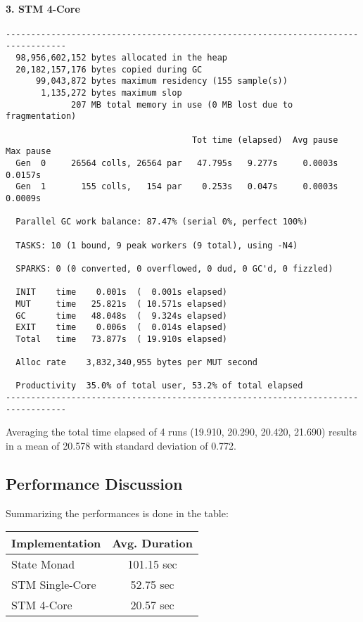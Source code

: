 \paragraph{3. STM 4-Core}
\begin{verbatim}
----------------------------------------------------------------------------------
  98,956,602,152 bytes allocated in the heap
  20,182,157,176 bytes copied during GC
      99,043,872 bytes maximum residency (155 sample(s))
       1,135,272 bytes maximum slop
             207 MB total memory in use (0 MB lost due to fragmentation)

                                     Tot time (elapsed)  Avg pause  Max pause
  Gen  0     26564 colls, 26564 par   47.795s   9.277s     0.0003s    0.0157s
  Gen  1       155 colls,   154 par    0.253s   0.047s     0.0003s    0.0009s

  Parallel GC work balance: 87.47% (serial 0%, perfect 100%)

  TASKS: 10 (1 bound, 9 peak workers (9 total), using -N4)

  SPARKS: 0 (0 converted, 0 overflowed, 0 dud, 0 GC'd, 0 fizzled)

  INIT    time    0.001s  (  0.001s elapsed)
  MUT     time   25.821s  ( 10.571s elapsed)
  GC      time   48.048s  (  9.324s elapsed)
  EXIT    time    0.006s  (  0.014s elapsed)
  Total   time   73.877s  ( 19.910s elapsed)

  Alloc rate    3,832,340,955 bytes per MUT second

  Productivity  35.0% of total user, 53.2% of total elapsed
----------------------------------------------------------------------------------
\end{verbatim}
 
Averaging the total time elapsed of 4 runs (19.910, 20.290, 20.420, 21.690) results in a mean of 20.578 with standard deviation of 0.772.

\subsection{Performance Discussion}
Summarizing the performances is done in the table:

\begin{center}
  \begin{tabular}{ l || c }
    Implementation & Avg. Duration \\ \hline \hline 
    State Monad & 101.15 sec \\ \hline
   	STM Single-Core & 52.75 sec \\ \hline
   	STM 4-Core & 20.57 sec \\ \hline
  \end{tabular}
\end{center}

